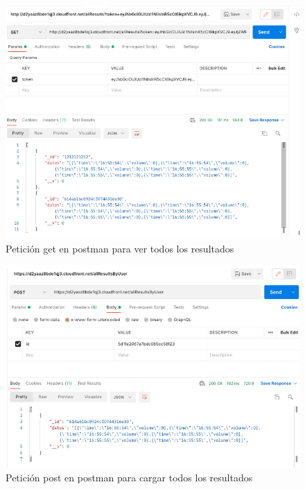 \documentclass[12pt]{article}
\begin{document}
\begin{enumerate}
            
            \begin{figure}[ht]
            \centering
            \includegraphics[scale=0.4]{imag/allresultsonline.png}
            \caption{Petición get en postman para ver todos los resultados }
            \label{6}
            \end{figure}
            \FloatBarrier
            
            
            \begin{figure}[ht]
            \centering
            \includegraphics[scale=0.4]{imag/allresultsbyuseronline.png}
            \caption{Petición post en postman para cargar todos los resultados }
            \label{6}
            \end{figure}
            \FloatBarrier
            

\end{enumerate}
\end{document}
